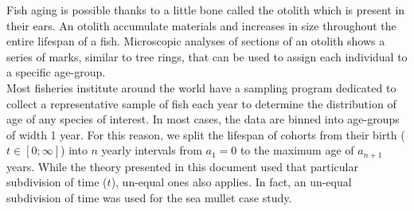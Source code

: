 Fish aging is possible thanks to a little bone called the otolith which is present in their ears. An otolith accumulate materials and increases in size throughout the entire lifespan of a fish. Microscopic analyses of sections of an otolith shows a series of marks, similar to tree rings, that can be used to assign each individual to a specific age-group.\\

Most fisheries institute around the world have a sampling program dedicated to collect a representative sample of fish each year to determine the distribution of age of any species of interest. In most cases, the data are binned into age-groups of width 1 year. For this reason, we split the lifespan of cohorts from their birth ($t \in [0;\infty]$) into $n$ yearly intervals from $a_{1}=0$ to the maximum age of $a_{n+1}$ years. While the theory presented in this document used that particular subdivision of time ($t$), un-equal ones also applies. In fact, an un-equal subdivision of time was used for the sea mullet case study.
 
